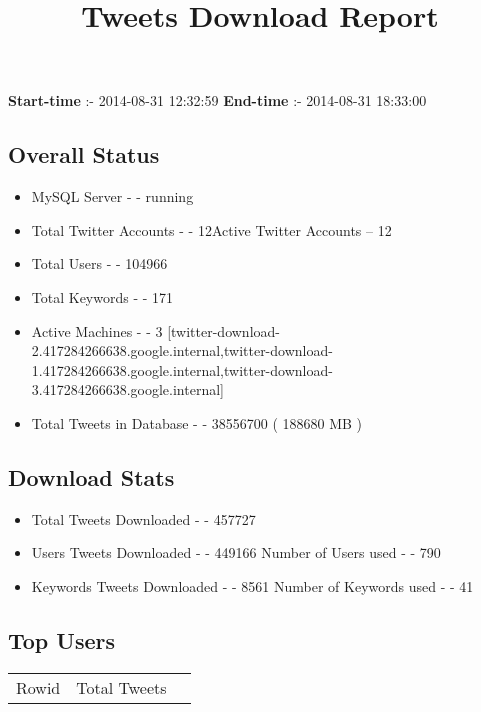 \documentclass{article}\usepackage[T1]{fontenc}
\begin{document}
\title{\textbf{Tweets Download Report}}
               \date{}
                \maketitle
               \centerline{\textbf{Start-time} :- 2014-08-31 12:32:59 \hspace{40pt} \textbf{End-time} :- 2014-08-31 18:33:00}               \subsection*{Overall Status}                \begin{itemize}                \item MySQL Server - - running               \item Total Twitter Accounts - - 12\newline Active Twitter Accounts -- 12               \item Total Users - - 104966               \item Total Keywords - - 171               \item Active Machines - - 3 [twitter-download-2.417284266638.google.internal,twitter-download-1.417284266638.google.internal,twitter-download-3.417284266638.google.internal]               \item Total Tweets in Database - - 38556700 ( 188680 MB )               \end{itemize}               \subsection*{Download Stats}                \begin{itemize}                \item Total Tweets Downloaded - - 457727               \item Users Tweets Downloaded - - 449166 \newline Number of Users used - - 790               \item Keywords Tweets Downloaded - - 8561 \newline Number of Keywords used - - 41              \end{itemize}              \subsection*{Top Users}\begin{tabular}{|c|c|c|}         \hline         Rowid & Total Tweets \\ 

\end{tabular}
\end{document}
